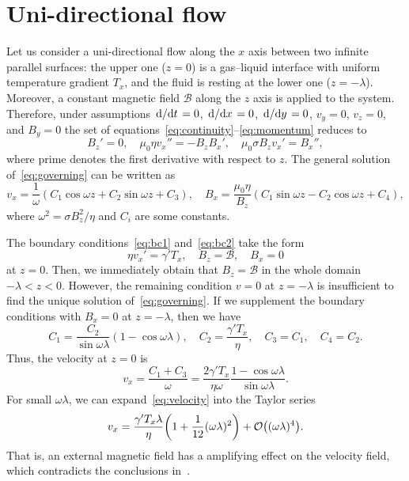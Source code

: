 \documentclass{article}
\begin{document}
\section{Uni-directional flow}

Let us consider a uni-directional flow along the $x$ axis between two infinite parallel surfaces: 
the upper one ($z=0$) is a gas--liquid interface with uniform temperature gradient $T_x$,
and the fluid is resting at the lower one ($z=-\lambda$).
Moreover, a constant magnetic field $\mathcal{B}$ along the $z$ axis is applied to the system.
Therefore, under assumptions $\dv*{t}=0$, $\dv*{x}=0$, $\dv*{y}=0$, $v_y=0$, $v_z=0$, and $B_y=0$ the set of equations~\eqref{eq:continuity}--\eqref{eq:momentum} reduces to
\begin{equation}\label{eq:governing}
    B_z' = 0, \quad \mu_0\eta v_x'' = -B_z B_x', \quad \mu_0\sigma B_z v_x' = B_x'',
\end{equation}
where prime denotes the first derivative with respect to $z$.
The general solution of~\eqref{eq:governing} can be written as
\begin{equation}\label{eq:general_solution}
    v_x = \frac1\omega(C_1\cos\omega z + C_2\sin\omega z + C_3), \quad
    B_x = \frac{\mu_0\eta}{B_z}(C_1\sin\omega z - C_2\cos\omega z + C_4),
\end{equation}
where $\omega^2 = \sigma B_z^2/\eta$ and $C_i$ are some constants.

The boundary conditions~\eqref{eq:bc1} and~\eqref{eq:bc2} take the form
\begin{equation}\label{eq:bc}
    \eta v_x' = \gamma' T_x, \quad B_z = \mathcal{B}, \quad B_x = 0
\end{equation}
at $z=0$.
Then, we immediately obtain that $B_z=\mathcal{B}$ in the whole domain $-\lambda<z<0$.
However, the remaining condition $v=0$ at $z=-\lambda$ is insufficient to find the unique solution of~\eqref{eq:governing}.
If we supplement the boundary conditions with $B_x = 0$ at $z=-\lambda$, then we have
\begin{equation}\label{eq:constants}
    C_1 = \frac{C_2}{\sin\omega\lambda}(1-\cos\omega\lambda), \quad
    C_2 = \frac{\gamma'T_x}{\eta}, \quad
    C_3 = C_1, \quad C_4 = C_2.
\end{equation}
Thus, the velocity at $z=0$ is
\begin{equation}\label{eq:velocity}
    v_x = \frac{C_1+C_3}{\omega} 
        = \frac{2\gamma'T_x}{\eta\omega}\frac{1-\cos\omega\lambda}{\sin\omega\lambda}.
\end{equation}
For small $\omega\lambda$, we can expand~\eqref{eq:velocity} into the Taylor series
\begin{equation}\label{eq:velocity_asym}
    v_x = \frac{\gamma'T_x\lambda}{\eta}\qty(1+\frac1{12}(\omega\lambda)^2) + \order{(\omega\lambda)^4}.
\end{equation}
That is, an external magnetic field has a amplifying effect on the velocity field, which contradicts the conclusions in~\cite{du2019influence}.
\end{document}
